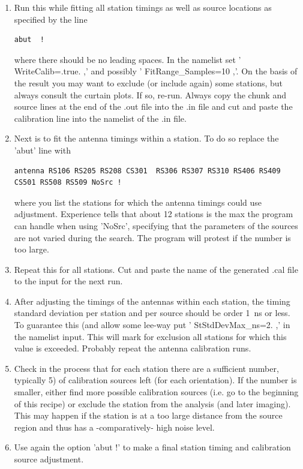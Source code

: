 \begin{enumerate}
\item Run this while fitting all station timings as well as source locations as specified by the line
{
 \tiny \begin{verbatim}
abut  !
\end{verbatim}
}
where there should be no leading spaces. In the namelist set ' WriteCalib=.true. ,' and possibly ' FitRange\_Samples=10 ,'. On the basis of the result you may want to exclude (or include again) some stations, but always consult the curtain plots. If so, re-run. Always copy the chunk and source lines at the end of the .out file into the .in file and cut and paste the calibration line into the namelist of the .in file.
\item Next is to fit the antenna timings within a station. To do so replace the 'abut' line with
{
\tiny \begin{verbatim}
antenna RS106 RS205 RS208 CS301  RS306 RS307 RS310 RS406 RS409 CS501 RS508 RS509 NoSrc !
\end{verbatim}
}
where you list the stations for which the antenna timings could use adjustment. Experience tells that about 12 stations is the max the program can handle when using 'NoSrc', specifying that the parameters of the sources are not varied during the search. The program will protest if the number is too large.
\item Repeat this for all stations. Cut and paste the name of the generated .cal file to the input for the next run.
\item After adjusting the timings of the antennas within each station, the timing standard deviation per station and per source should be order 1~ns or less. To guarantee this (and allow some lee-way put ' StStdDevMax\_ns=2. ,' in the namelist input. This will mark for exclusion all stations for which this value is exceeded. Probably repeat the antenna calibration runs.
\item Check in the process that for each station there are a sufficient number, typically 5) of calibration sources left (for each orientation). If the number is smaller, either find more possible calibration sources (i.e. go to the beginning of this recipe) or exclude the station from the analysis (and later imaging). This may happen if the station is at a too large distance from the source region and thus has a -comparatively- high noise level.
\item Use again the option 'abut !' to make a final station timing and calibration source adjustment.
\end{enumerate}

